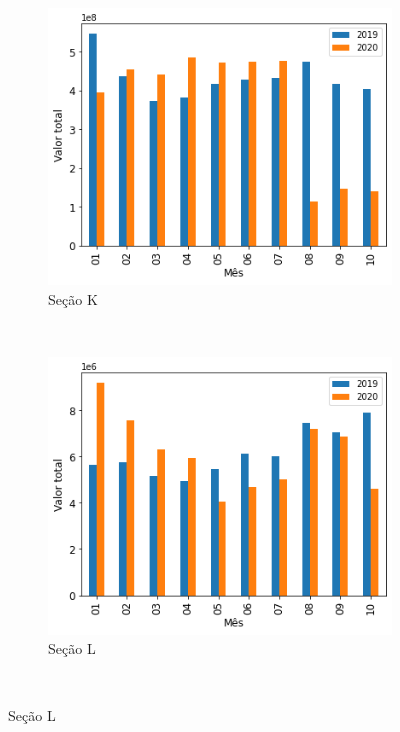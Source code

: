 \begin{figure}[htb]
\begin{subfigure}[b]{0.45\textwidth}
        \includegraphics[scale=0.45]{images/base-de-dados-17.K-comparacao-valor-total-por-secao.png}
        \caption{Seção K}
        \label{fig:pandemia:descritiva-17.K-comparacao-valor-total-por-secao}
    \end{subfigure} ~ \quad
    \begin{subfigure}[b]{0.45\textwidth}
        \includegraphics[scale=0.45]{images/base-de-dados-17.L-comparacao-valor-total-por-secao.png}
        \caption{Seção L}
        \label{fig:pandemia:descritiva-17.L-comparacao-valor-total-por-secao}
    \end{subfigure} ~ \\
    \fautor
\end{figure}

